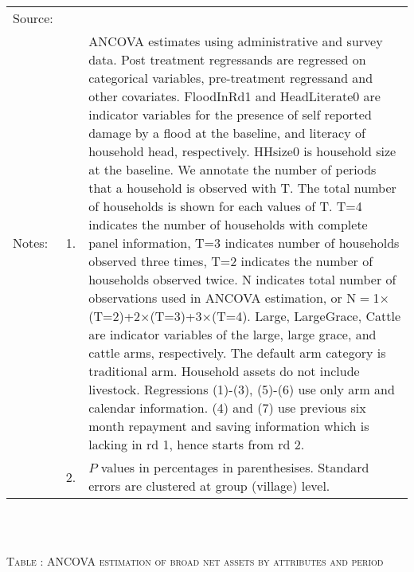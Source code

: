 \begin{minipage}[t]{14cm}
\begin{tabular}{>{\hfill\scriptsize}p{1cm}<{}>{\hfill\scriptsize}p{.25cm}<{}>{\scriptsize}p{12cm}<{\hfill}}
Source:& \multicolumn{2}{l}{\scriptsize Estimated with GUK administrative and survey data.}\\
Notes: & 1. & ANCOVA estimates using administrative and survey data. Post treatment regressands are regressed on categorical variables, pre-treatment regressand and other covariates. \textsf{FloodInRd1} and \textsf{HeadLiterate0} are indicator variables for the presence of self reported damage by a flood at the baseline, and literacy of household head, respectively. \textsf{HHsize0} is household size at the baseline. We annotate the number of periods that a household is observed with \textsf{T}. The total number of households is shown for each values of \textsf{T}. \textsf{T=4} indicates the number of households with complete panel information, \textsf{T=3} indicates number of households observed three times, \textsf{T=2} indicates the number of households observed twice. \textsf{N} indicates total number of observations used in ANCOVA estimation, or \textsf{N$=$1$\times$(T=2)+2$\times$(T=3)+3$\times$(T=4)}.  \textsf{Large}, \textsf{LargeGrace}, \textsf{Cattle} are indicator variables of the \textsf{large}, \textsf{large grace}, and \textsf{cattle} arms, respectively. The default arm category is \textsf{traditional} arm. Household assets do not include livestock. Regressions (1)-(3), (5)-(6) use only arm and calendar information. (4) and (7) use previous six month repayment and saving information which is lacking in rd 1, hence starts from rd 2.\\
& 2. &  $P$ values in percentages in parenthesises. Standard errors are clustered at group (village) level. %
 \end{tabular}
\end{minipage} \\\\\hspace{-1cm}\begin{minipage}[t]{14cm} \hfil\textsc{\normalsize Table \thetable: ANCOVA estimation of broad net assets by attributes and period\label{tab ANCOVA net assets timevarying attributes}}\\ \setlength{\tabcolsep}{1pt}
  \setlength{\baselineskip}{8pt}
  \renewcommand{\arraystretch}{.55}
  \hfil{}
\end{minipage}
